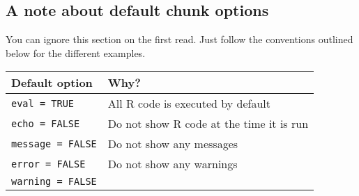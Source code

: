 \documentclass[
]{article}
\begin{document}
\hypertarget{a-note-about-default-chunk-options}{%
\subsection{A note about default chunk
options}\label{a-note-about-default-chunk-options}}

You can ignore this section on the first read. Just follow the
conventions outlined below for the different examples.

\begin{longtable}[]{@{}ll@{}}
\toprule
\begin{minipage}[b]{0.24\columnwidth}\raggedright
Default option\strut
\end{minipage} & \begin{minipage}[b]{0.70\columnwidth}\raggedright
Why?\strut
\end{minipage}\tabularnewline
\midrule
\endhead
\begin{minipage}[t]{0.24\columnwidth}\raggedright
\texttt{eval\ =\ TRUE}\strut
\end{minipage} & \begin{minipage}[t]{0.70\columnwidth}\raggedright
All R code is executed by default\strut
\end{minipage}\tabularnewline
\begin{minipage}[t]{0.24\columnwidth}\raggedright
\texttt{echo\ =\ FALSE}\strut
\end{minipage} & \begin{minipage}[t]{0.70\columnwidth}\raggedright
Do not show R code at the time it is run\strut
\end{minipage}\tabularnewline
\begin{minipage}[t]{0.24\columnwidth}\raggedright
\texttt{message\ =\ FALSE}\strut
\end{minipage} & \begin{minipage}[t]{0.70\columnwidth}\raggedright
Do not show any messages\strut
\end{minipage}\tabularnewline
\begin{minipage}[t]{0.24\columnwidth}\raggedright
\texttt{error\ =\ FALSE}\strut
\end{minipage} & \begin{minipage}[t]{0.70\columnwidth}\raggedright
Do not show any warnings\strut
\end{minipage}\tabularnewline
\begin{minipage}[t]{0.24\columnwidth}\raggedright
\texttt{warning\ =\ FALSE}\strut
\end{minipage} & \begin{minipage}[t]{0.70\columnwidth}\raggedright

\end{minipage}
\end{longtable}
\end{document}
